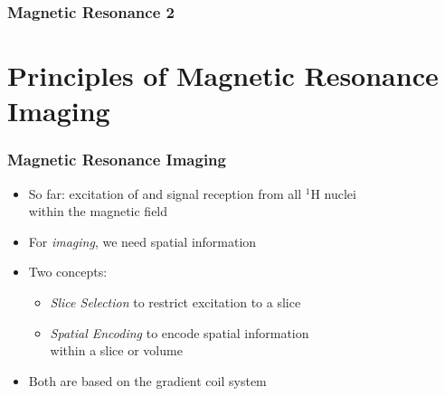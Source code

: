 

\usepackage[]{subcaption} 

\renewcommand{\vec}[1]{\boldsymbol{#1}}
\newcommand{\mat}[1]{\boldsymbol{#1}}

\newcommand\B[1]{\ensuremath{\vec{B}_{#1}}}

\def\longtime{\ensuremath{T_1}}						%
\def\transtime{\ensuremath{T_2}}						%
\def\inhomogtime{\ensuremath{\transtime^*}}						%

\def\spatialfreq{\ensuremath{s}}      %

\def\larmorfreq{\ensuremath{f_\ell}}  %

\def\hydrogen{\ensuremath{{}^1\textrm{H}}} %

\def\magn{\ensuremath{\vec M}}
\def\magnzero{\ensuremath{\magn_0}}
\def\magnlong{\ensuremath{\magn_z}} %
\def\magntrans{\ensuremath{\magn_{xy}}} %


\subtitle{Magnetic Resonance II}



\frame[plain]{\titlepage}

\begin{frame}
  \frametitle{Magnetic Resonance 2}
  
  \tableofcontents
\end{frame}

\section{Principles of Magnetic Resonance Imaging}%
\label{sec:principles_of_magnetic_resonance_imaging}

\begin{frame}
	\frametitle{Magnetic Resonance {\color{red}Imaging}}
	
	\begin{itemize}
		\item So far: excitation of and signal reception from all \hydrogen{} nuclei \\ within the magnetic field
		\item For \emph{imaging}, we need spatial information
		\item Two concepts:
		\begin{itemize}
			\item \emph{Slice Selection} to restrict excitation to a slice
			\item \emph{Spatial Encoding} to encode spatial information \\ within a slice or volume
		\end{itemize}
		\item Both are based on the gradient coil system
	\end{itemize}
\end{frame}


